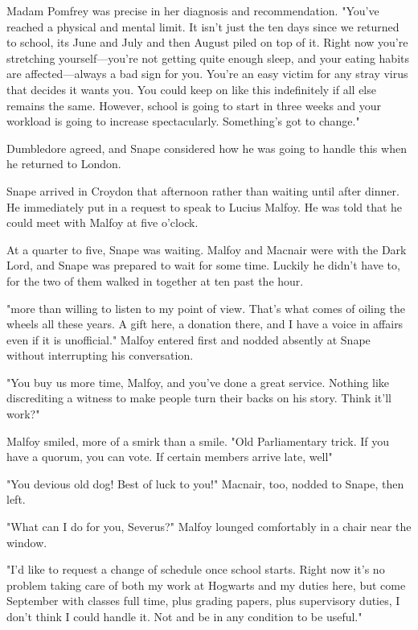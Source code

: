 Madam Pomfrey was precise in her diagnosis and recommendation. "You've reached a physical and mental limit. It isn't just the ten days since we returned to school, its June and July and then August piled on top of it. Right now you're stretching yourself—you're not getting quite enough sleep, and your eating habits are affected—always a bad sign for you. You're an easy victim for any stray virus that decides it wants you. You could keep on like this indefinitely if all else remains the same. However, school is going to start in three weeks and your workload is going to increase spectacularly. Something's got to change."

Dumbledore agreed, and Snape considered how he was going to handle this when he returned to London.

Snape arrived in Croydon that afternoon rather than waiting until after dinner. He immediately put in a request to speak to Lucius Malfoy. He was told that he could meet with Malfoy at five o'clock.

At a quarter to five, Snape was waiting. Malfoy and Macnair were with the Dark Lord, and Snape was prepared to wait for some time. Luckily he didn't have to, for the two of them walked in together at ten past the hour.

"{\el}more than willing to listen to my point of view. That's what comes of oiling the wheels all these years. A gift here, a donation there, and I have a voice in affairs even if it is unofficial." Malfoy entered first and nodded absently at Snape without interrupting his conversation.

"You buy us more time, Malfoy, and you've done a great service. Nothing like discrediting a witness to make people turn their backs on his story. Think it'll work?"

Malfoy smiled, more of a smirk than a smile. "Old Parliamentary trick. If you have a quorum, you can vote. If certain members arrive late, well{\el}"

"You devious old dog! Best of luck to you!" Macnair, too, nodded to Snape, then left.

"What can I do for you, Severus?" Malfoy lounged comfortably in a chair near the window.

"I'd like to request a change of schedule once school starts. Right now it's no problem taking care of both my work at Hogwarts and my duties here, but come September with classes full time, plus grading papers, plus supervisory duties, I don't think I could handle it. Not and be in any condition to be useful."

